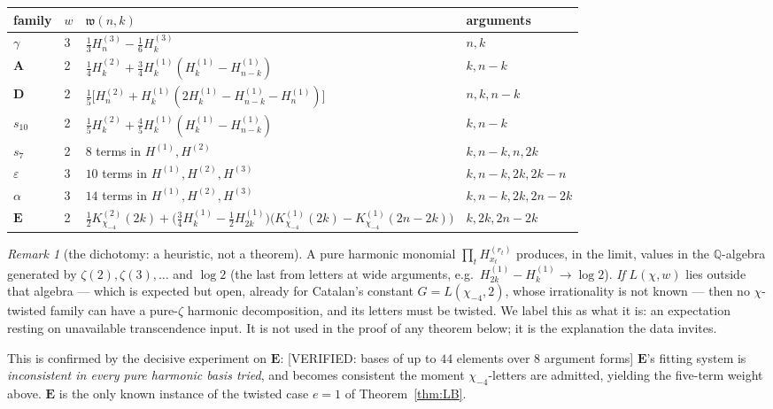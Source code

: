 \documentclass[11pt,reqno]{amsart}
\theoremstyle{plain}
\theoremstyle{definition}
\theoremstyle{remark}
\newtheorem{remark}[theorem]{Remark}
\newcommand{\Q}{\mathbb{Q}}
\newcommand{\HH}[2]{H^{(#1)}_{#2}}
\newcommand{\KK}[3]{K^{(#1)}_{#2}\!\left(#3\right)}
\newcommand{\VerifiedR}[1]{\textup{\textsf{[VERIFIED: #1]}}}
\numberwithin{equation}{section}
\begin{document}
\begin{center}\small
\begin{tabular}{@{}llll@{}}
\toprule
family & $w$ & $\mathfrak w(n,k)$ & arguments\\
\midrule
$\gamma$&3&$\tfrac13\HH3n-\tfrac16\HH3k$&$n,k$\\
$\mathbf A$&2&$\tfrac14\HH2k+\tfrac34\HH1k(\HH1k-\HH1{n-k})$&$k,n-k$\\
$\mathbf D$&2&$\tfrac15\bigl[\HH2n+\HH1k(2\HH1k-\HH1{n-k}-\HH1n)\bigr]$&$n,k,n-k$\\
$s_{10}$&2&$\tfrac15\HH2k+\tfrac45\HH1k(\HH1k-\HH1{n-k})$&$k,n-k$\\
$s_7$&2&$8$ terms in $H^{(1)},H^{(2)}$&$k,n-k,n,2k$\\
$\varepsilon$&3&$10$ terms in $H^{(1)},H^{(2)},H^{(3)}$&$k,n-k,2k,2k-n$\\
$\alpha$&3&$14$ terms in $H^{(1)},H^{(2)},H^{(3)}$&$k,n-k,2k,2n-2k$\\
$\mathbf E$&2&$\tfrac12\KK2{\chi_{-4}}{2k}
  +\bigl(\tfrac34\HH1k-\tfrac12\HH1{2k}\bigr)
   \bigl(\KK1{\chi_{-4}}{2k}-\KK1{\chi_{-4}}{2n-2k}\bigr)$&$k,2k,2n-2k$\\
\bottomrule
\end{tabular}
\end{center}

\begin{remark}[the dichotomy: a heuristic, not a theorem]\label{obs:dichotomy}
A pure harmonic monomial $\prod_t\HH{r_t}{x_t}$ produces, in the limit, values in the
$\Q$-algebra generated by $\zeta(2),\zeta(3),\dots$ and $\log2$ (the last from letters at
wide arguments, e.g.\ $\HH1{2k}-\HH1k\to\log2$). \emph{If} $L(\chi,w)$ lies outside that
algebra --- which is expected but open, already for Catalan's constant
$G=L(\chi_{-4},2)$, whose irrationality is not known --- then no $\chi$-twisted family can
have a pure-$\zeta$ harmonic decomposition, and its letters must be twisted. We label this
as what it is: an expectation resting on unavailable transcendence input. It is not used in
the proof of any theorem below; it is the explanation the data invites.
\end{remark}

This is confirmed by the decisive experiment on $\mathbf E$: \VerifiedR{bases of up to $44$
elements over $8$ argument forms} $\mathbf E$'s fitting system is \emph{inconsistent in
every pure harmonic basis tried}, and becomes consistent the moment $\chi_{-4}$-letters are
admitted, yielding the five-term weight above. $\mathbf E$ is the only known instance of the
twisted case $e=1$ of Theorem~\ref{thm:LB}.
\end{document}
